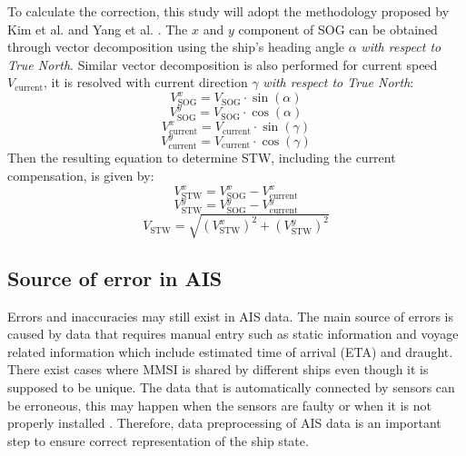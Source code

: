 To calculate the correction, this study will adopt the methodology proposed by Kim et al.  and Yang et al. . The $x$ and $y$ component of SOG can be obtained through vector decomposition using the ship's heading angle $\alpha$ \emph{with respect to True North}. Similar vector decomposition is also performed for current speed $V_{\text{current}}$, it is resolved with current direction $\gamma$ \emph{with respect to True North}:\\

\begin{equation}\label{eqn:sogx}
    V_{\text{SOG}}^x = V_{\text{SOG}}\cdot\sin(\alpha)   
\end{equation}
\begin{equation}\label{eqn:sogy}
    V_{\text{SOG}}^y = V_{\text{SOG}}\cdot\cos(\alpha)   
\end{equation} 
\begin{equation}\label{eqn:vcurrx}
     V_{\text{current}}^x = V_{\text{current}}\cdot\sin(\gamma)   
\end{equation}
\begin{equation}\label{eqn:vcurry}
    V_{\text{current}}^y = V_{\text{current}}\cdot\cos(\gamma)   
\end{equation}
Then the resulting equation to determine STW, including the current compensation, is given by:\\
\begin{equation}\label{eqn:stwx}
    V_{\text{STW}}^x = V_{\text{SOG}}^x - V_{\text{current}}^x    
\end{equation}
\begin{equation}\label{eqn:stwy}
    V_{\text{STW}}^y = V_{\text{SOG}}^y - V_{\text{current}}^y      
\end{equation}
\begin{equation}\label{eqn:stwabs}
    V_{\text{STW}} = \sqrt{(V_{\text{STW}}^x)^2 + (V_{\text{STW}}^y)^2} 
\end{equation}

\subsection{Source of error in AIS}\label{sec:AIS_error}

Errors and inaccuracies may still exist in AIS data. The main source of errors is caused by data that requires manual entry such as static information and voyage related information which include estimated time of arrival (ETA) and draught. There exist cases where MMSI is shared by different ships even though it is supposed to be unique. The data that is automatically connected by sensors can be erroneous, this may happen when the sensors are faulty or when it is not properly installed . Therefore, data preprocessing of AIS data is an important step to ensure correct representation of the ship state.\\    

